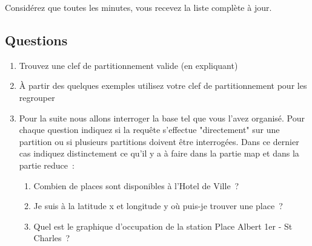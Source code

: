 \documentclass[12pt,letterpaper]{article}
\begin{document}
Considérez que toutes les minutes, vous recevez la liste complète à jour.

\subsection*{Questions}

\begin{enumerate}
\item Trouvez une clef de partitionnement valide (en expliquant)
\item À partir des quelques exemples utilisez votre clef de partitionnement pour les regrouper
\item Pour la suite nous allons interroger la base tel que vous l'avez organisé.
 Pour chaque question indiquez si la requête s'effectue "directement" sur une partition ou
 si plusieurs partitions doivent être interrogées. Dans ce dernier cas indiquez distinctement
 ce qu'il y a à faire dans la partie map et dans la partie reduce~:
    \begin{enumerate}
	\item Combien de places sont disponibles à l'Hotel de Ville~?
	\item Je suis à la latitude x et longitude y où puis-je trouver une place~?
	\item Quel est le graphique d'occupation de la station Place Albert 1er - St Charles~?
    \end{enumerate}
\end{enumerate}
\end{document}
